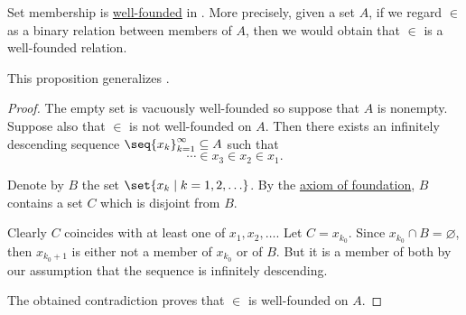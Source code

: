 \begin{proposition}\label{thm:set_membership_is_well_founded}
  Set membership is \hyperref[def:well_founded_relation]{well-founded} in . More precisely, given a set \( A \), if we regard \( \in \) as a binary relation between members of \( A \), then we would obtain that \( \in \) is a well-founded relation.

  This proposition generalizes .
\end{proposition}
\begin{proof}
  The empty set is vacuously well-founded so suppose that \( A \) is nonempty. Suppose also that \( \in \) is not well-founded on \( A \). Then there exists an infinitely descending sequence \( \seq{ x_k }_{k=1}^\infty \subseteq A \) such that
  \begin{equation*}
    \cdots \in x_3 \in x_2 \in x_1.
  \end{equation*}

  Denote by \( B \) the set \( \set{ x_k \given k = 1, 2, \ldots } \). By the \hyperref[def:zfc/foundation]{axiom of foundation}, \( B \) contains a set \( C \) which is disjoint from \( B \).

  Clearly \( C \) coincides with at least one of \( x_1, x_2, \ldots \). Let \( C = x_{k_0} \). Since \( x_{k_0} \cap B = \varnothing \), then \( x_{k_0 + 1} \) is either not a member of \( x_{k_0} \) or of \( B \). But it is a member of both by our assumption that the sequence is infinitely descending.

  The obtained contradiction proves that \( \in \) is well-founded on \( A \).
\end{proof}

